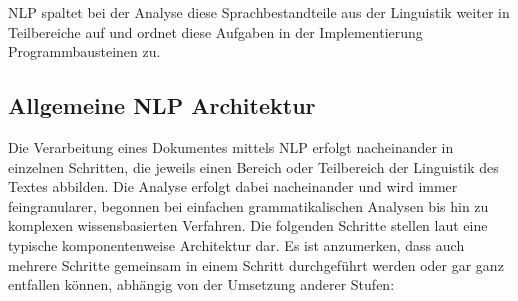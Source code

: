 \documentclass[12pt]{report}
\begin{document}
NLP spaltet bei der Analyse diese Sprachbestandteile aus der Linguistik weiter in Teilbereiche auf und ordnet diese Aufgaben in der Implementierung Programmbausteinen zu.

\subsection{Allgemeine NLP Architektur}
Die Verarbeitung eines Dokumentes mittels NLP erfolgt nacheinander in einzelnen Schritten, die jeweils einen Bereich oder Teilbereich der Linguistik des Textes abbilden. Die Analyse erfolgt dabei nacheinander und wird immer feingranularer, begonnen bei einfachen grammatikalischen Analysen bis hin zu komplexen wissensbasierten Verfahren. Die folgenden Schritte stellen laut \cite{cop04} eine typische komponentenweise Architektur dar. Es ist anzumerken, dass auch mehrere Schritte gemeinsam in einem Schritt durchgeführt werden oder gar ganz entfallen können, abhängig von der Umsetzung anderer Stufen:
\end{document}
